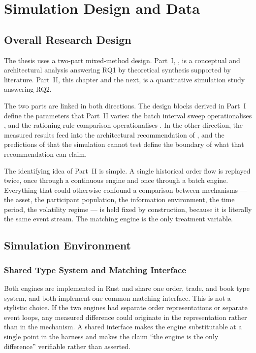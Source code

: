 \chapter{Simulation Design and Data}
\label{ch:simulation}

\section{Overall Research Design}
\label{sec:design}

The thesis uses a two-part mixed-method design. Part~I,
, is a conceptual and architectural analysis answering
RQ1 by theoretical synthesis supported by literature. Part~II, this
chapter and the next, is a quantitative simulation study answering RQ2.

The two parts are linked in both directions. The design blocks derived
in Part~I define the parameters that Part~II varies: the batch interval
sweep operationalises , and the rationing rule
comparison operationalises . In the other direction,
the measured results feed into the architectural recommendation of
, and the predictions of  that
the simulation cannot test define the boundary of what that
recommendation can claim.

The identifying idea of Part~II is simple. A single historical order
flow is replayed twice, once through a continuous engine and once
through a batch engine. Everything that could otherwise confound a
comparison between mechanisms --- the asset, the participant
population, the information environment, the time period, the
volatility regime --- is held fixed by construction, because it is
literally the same event stream. The matching engine is the only
treatment variable.

\section{Simulation Environment}
\label{sec:environment}

\subsection{Shared Type System and Matching Interface}

Both engines are implemented in Rust and share one order, trade, and
book type system, and both implement one common matching interface.
This is not a stylistic choice. If the two engines had separate order
representations or separate event loops, any measured difference could
originate in the representation rather than in the mechanism. A shared
interface makes the engine substitutable at a single point in the
harness and makes the claim ``the engine is the only difference''
verifiable rather than asserted.

